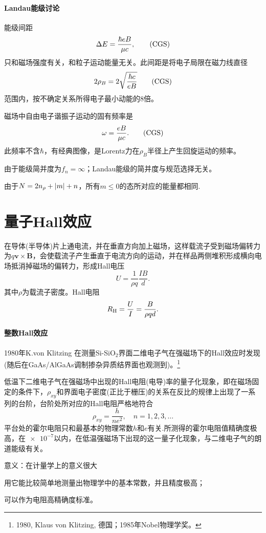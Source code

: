 \paragraph{Landau能级讨论}
\begin{compactenum}
	\item 能级间距
		\[
			\D E=\frac{\hbar eB}{\mu c},\CGS
		\]
		只和磁场强度有关，和粒子运动能量无关。此间距是将电子局限在磁力线直径
		\[
			2\rho_B=2\sqrt{\frac{\hbar c}{eB}}\CGS
		\]
		范围内，按不确定关系所得电子最小动能的8倍。
	\item 磁场中自由电子谐振子运动的固有频率是
		\[
			\omega=\frac{eB}{\mu c}.\CGS
		\]
		此频率不含$\hbar$，有经典图像，是Lorentz力在$\rho_B$半径上产生回旋运动的频率。
	\item 由于能级简并度为$f_n=\infty$；Landau能级的简并度与规范选择无关。

		由于$N=2n_\rho+\left\lvert m\right\rvert+n$，所有$m\leqslant 0$的态所对应的能量都相同.
\end{compactenum}
\section{量子Hall效应}
在导体(半导体)片上通电流，并在垂直方向加上磁场，这样载流子受到磁场偏转力为$q\bm v\times\bm B$，会使载流子产生垂直于电流方向的运动，并在样品两侧堆积形成横向电场抵消掉磁场的偏转力，形成Hall电压
\[
U=\frac1{\rho q}\frac{IB}d.
\]
其中$\rho$为载流子密度。Hall电阻
\[
R_\mathrm H=\frac UI=\frac B{\rho qd}.
\]
\paragraph{整数Hall效应}
1980年K.von Klitzing 在测量Si-SiO$_2$界面二维电子气在强磁场下的Hall效应时发现(随后在GaAs/AlGaAs调制掺杂异质结界面也观测到)。\footnote{1980, Klaus von Klitzing, 德国；1985年Nobel物理学奖。}

低温下二维电子气在强磁场中出现的Hall电阻(电导)率的量子化现象，即在磁场固定的条件下，$\rho_{xy}$和界面电子密度(正比于栅压)的关系在反比的规律上出现了一系列的台阶，台阶处所对应的Hall电阻严格地符合
\[
	\rho_{xy}=\frac h{ne^2},\quad n=1,2,3,\ldots
\]
平台处的霍尔电阻只和最基本的物理常数$h$和$e$有关.所测得的霍尔电阻值精确度极高，在$\num{e-7}$以内，在低温强磁场下出现的这一量子化现象，与二维电子气的朗道能级有关。

意义：在计量学上的意义很大
\begin{compactenum}
	\item 用它能比较简单地测量出物理学中的基本常数，并且精度极高；
	\item 可以作为电阻高精确度标准。
\end{compactenum}
